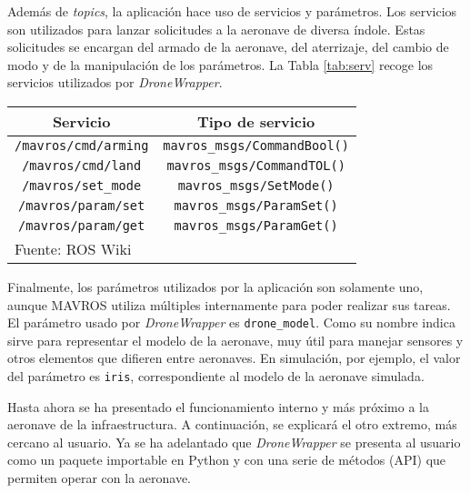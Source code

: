 \documentclass[../main.tex]{subfiles}
\begin{document}
Además de \emph{topics}, la aplicación hace uso de servicios y parámetros. Los servicios son utilizados para lanzar solicitudes a la aeronave de diversa índole. Estas solicitudes se encargan del armado de la aeronave, del aterrizaje, del cambio de modo y de la manipulación de los parámetros. La Tabla \ref{tab:serv} recoge los servicios utilizados por \emph{DroneWrapper}.

\begin{table}[ht]
	{\begin{tabular}{|c|c|}
		\hline
		\textbf{Servicio} & \textbf{Tipo de servicio} \\
		\hline
		\lstinline{/mavros/cmd/arming} & \lstinline{mavros_msgs/CommandBool()} \\
		\hline
		\lstinline{/mavros/cmd/land} & \lstinline{mavros_msgs/CommandTOL()} \\
		\hline
		\lstinline{/mavros/set_mode} & \lstinline{mavros_msgs/SetMode()} \\
		\hline
		\lstinline{/mavros/param/set} & \lstinline{mavros_msgs/ParamSet()} \\
		\hline
		\lstinline{/mavros/param/get} & \lstinline{mavros_msgs/ParamGet()} \\
		\hline
		\multicolumn{2}{l}{Fuente: ROS Wiki}
	\end{tabular}}
\end{table}

Finalmente, los parámetros utilizados por la aplicación son solamente uno, aunque MAVROS utiliza múltiples internamente para poder realizar sus tareas. El parámetro usado por \emph{DroneWrapper} es \lstinline{drone_model}. Como su nombre indica sirve para representar el modelo de la aeronave, muy útil para manejar sensores y otros elementos que difieren entre aeronaves. En simulación, por ejemplo, el valor del parámetro es \lstinline{iris}, correspondiente al modelo de la aeronave simulada.

Hasta ahora se ha presentado el funcionamiento interno y más próximo a la aeronave de la infraestructura. A continuación, se explicará el otro extremo, más cercano al usuario. Ya se ha adelantado que \emph{DroneWrapper} se presenta al usuario como un paquete importable en Python y con una serie de métodos (API) que permiten operar con la aeronave.


\end{document}
